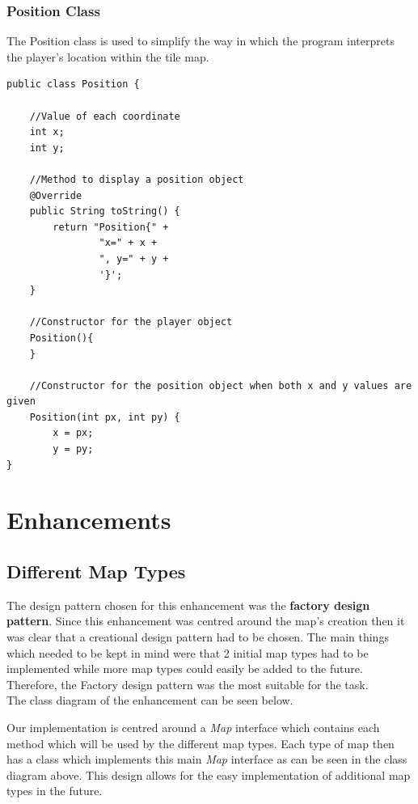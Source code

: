 \documentclass[a4paper,12pt]{extarticle}
\begin{document}
\subsubsection{Position Class}

The Position class is used to simplify the way in which the program interprets the player's location within the tile map.

\begin{lstlisting}[caption=The initial code of the Position class]
public class Position {

    //Value of each coordinate
    int x;
    int y;

    //Method to display a position object
    @Override
    public String toString() {
        return "Position{" +
                "x=" + x +
                ", y=" + y +
                '}';
    }

    //Constructor for the player object
    Position(){
    }

    //Constructor for the position object when both x and y values are given
    Position(int px, int py) {
        x = px;
        y = py;
}
\end{lstlisting}

\section{Enhancements}
\subsection{Different Map Types}

The design pattern chosen for this enhancement was the \textbf{factory design pattern}. Since this enhancement was centred around the map's creation then it was clear that a creational design pattern had to be chosen. The main things which needed to be kept in mind were that 2 initial map types had to be implemented while more map types could easily be added to the future. Therefore, the Factory design pattern was the most suitable for the task.\\

The class diagram of the enhancement can be seen below.\\

\newpage

\noindent Our implementation is centred around a \textit{Map} interface which contains each method which will be used by the different map types. Each type of map then has a class which implements this main \textit{Map} interface as can be seen in the class diagram above. This design allows for the easy implementation of additional map types in the future.\par
\end{document}
